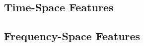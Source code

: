 \documentclass[12pt,letterpaper]{article}
\begin{document}
\paragraph*{}


\subsection{Time-Space Features}
\label{subsec-time}


\subsection{Frequency-Space Features}
\label{subsec-frequency}


\newpage
\end{document}
